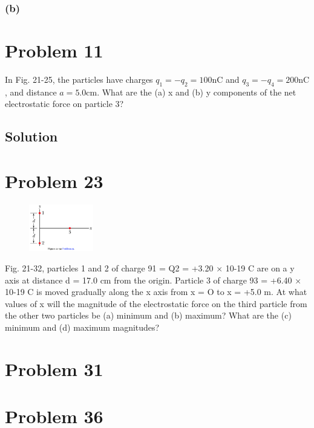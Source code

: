 \documentclass[12pt]{article}
\begin{document}
\subsubsection*{(b)}


\pagebreak
\section{Problem 11}
In Fig. 21-25, the particles have charges $q_1 = -q_2 = 100 \unit{\nano\coulomb}$ and $q_3 = -q_4 = 200 \unit{\nano\coulomb}$, and distance $a = 5.0\unit{\centi\meter}$. What are the (a) x and (b) y components of the net electrostatic force on particle 3?

\subsection{Solution}



\pagebreak
\section{Problem 23}
\begin{figure}
    \vspace{-30pt}
    \includegraphics[width=0.25\textwidth]{picture_6.png} 
\end{figure}
Fig. 21-32, particles 1 and 2 of charge 91 = Q2 = +3.20 × 10-19 C are on a y axis at distance d = 17.0 cm from the origin. Particle 3 of charge 93 = +6.40 × 10-19 C is moved gradually along the x axis from x = O to x = +5.0 m. At what values of x will the magnitude of the electrostatic force on the third particle from the other two particles be (a) minimum and (b) maximum? What are the (c) minimum and (d) maximum magnitudes?

\pagebreak
\section{Problem 31}

\pagebreak
\section{Problem 36}
\end{document}

